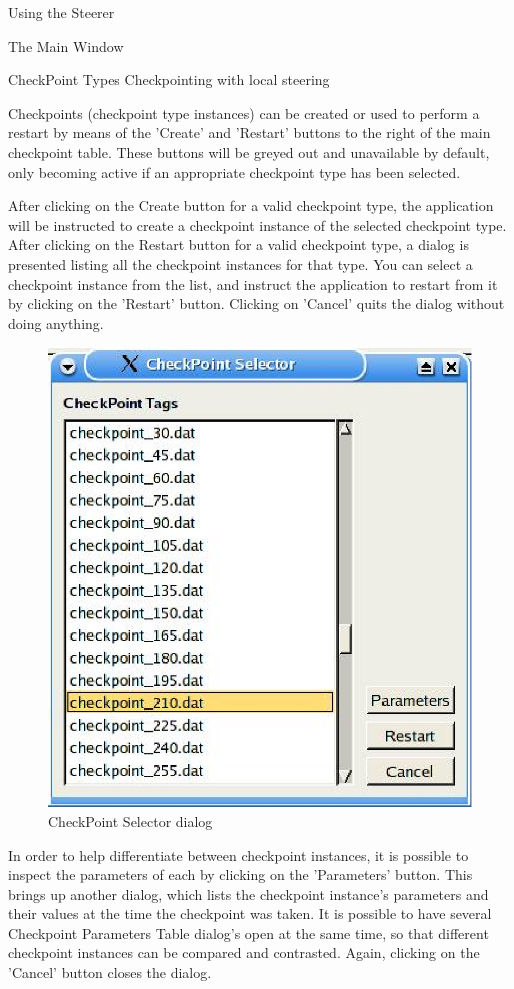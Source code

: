 \documentclass[a4paper,twoside]{article}
\begin{document}
\begin{section}{Using the Steerer}
\begin{subsection}{The Main Window}
\begin{subsubsection}{CheckPoint Types}
Checkpointing with local steering

Checkpoints (checkpoint type instances) can be created or used to
perform a restart by means of the 'Create' and 'Restart' buttons to
the right of the main checkpoint table. These buttons will be greyed
out and unavailable by default, only becoming active if an appropriate
checkpoint type has been selected.

After clicking on the Create button for a valid checkpoint type, the
application will be instructed to create a checkpoint instance of the
selected checkpoint type.  After clicking on the Restart button for a
valid checkpoint type, a dialog is presented listing all the
checkpoint instances for that type. You can select a checkpoint
instance from the list, and instruct the application to restart from
it by clicking on the 'Restart' button. Clicking on 'Cancel' quits the
dialog without doing anything.

\begin{figure}
\centerline{\includegraphics{chk_list.eps}}
\caption{CheckPoint Selector dialog}
\label{fig:chk_list_dialog}
\end{figure}

In order to help differentiate between checkpoint instances, it is
possible to inspect the parameters of each by clicking on the
'Parameters' button. This brings up another dialog, which lists the
checkpoint instance's parameters and their values at the time the
checkpoint was taken. It is possible to have several Checkpoint
Parameters Table dialog's open at the same time, so that different
checkpoint instances can be compared and contrasted.  Again, clicking
on the 'Cancel' button closes the dialog.


\end{subsubsection}
\end{subsection}
\end{section}
\end{document}
